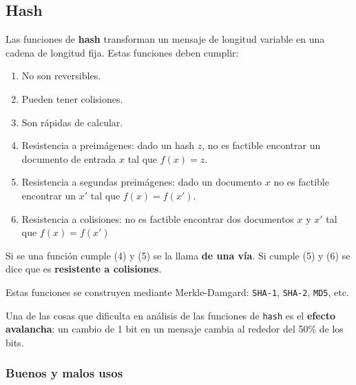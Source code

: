 \subsection{Hash}
Las funciones de \textbf{hash} transforman un mensaje de longitud variable en una cadena de longitud fija. Estas funciones deben cumplir:

\begin{enumerate}
	\item No son reversibles.
	\item Pueden tener colisiones.
	\item Son rápidas de calcular.
	\item Resistencia a preimágenes: dado un hash $z$, no es factible encontrar un documento de entrada $x$ tal que $f(x)=z$.
	\item Resistencia a segundas preimágenes: dado un documento $x$ no es factible encontrar un $x'$ tal que $f(x)=f(x')$.
	\item Resistencia a colisiones: no es factible encontrar dos documentos $x$ y $x'$ tal que $f(x) = f(x')$
\end{enumerate}

Si se una función cumple (4) y (5) se la llama \textbf{de una vía}. Si cumple (5) y (6) se dice que es \textbf{resistente a colisiones}.

Estas funciones se construyen mediante Merkle-Damgard: \texttt{SHA-1}, \texttt{SHA-2}, \texttt{MD5}, etc.

Una de las cosas que dificulta en análisis de las funciones de \texttt{hash} es el \textbf{efecto avalancha}: un cambio de 1 bit en un mensaje cambia al rededor del 50\% de los bits.

\subsubsection{Buenos y malos usos}

